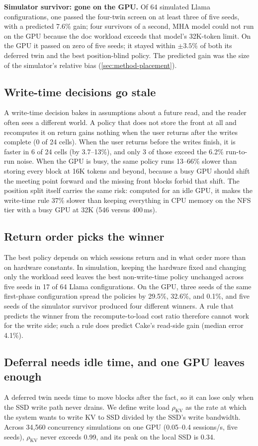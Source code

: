 \documentclass[conference]{IEEEtran}
\begin{document}
\textbf{Simulator survivor: gone on the GPU.}
Of 64 simulated Llama configurations, one passed the four-twin screen on at least three of five seeds, with a predicted 7.6\% gain; four survivors of a second, MHA model could not run on the GPU because the doc workload exceeds that model's 32K-token limit.
On the GPU it passed on zero of five seeds; it stayed within $\pm3.5\%$ of both its deferred twin and the best position-blind policy.
The predicted gain was the size of the simulator's relative bias (\cref{sec:method-placement}).

\subsection{Write-time decisions go stale}
A write-time decision bakes in assumptions about a future read, and the reader often sees a different world.
A policy that does not store the front at all and recomputes it on return gains nothing when the user returns after the writes complete (0 of 24 cells).
When the user returns before the writes finish, it is faster in 6 of 24 cells (by 3.7--13\%), and only 3 of those exceed the 6.2\% run-to-run noise.
When the GPU is busy, the same policy runs 13--66\% slower than storing every block at 16K tokens and beyond, because a busy GPU should shift the meeting point forward and the missing front blocks forbid that shift.
The position split itself carries the same risk: computed for an idle GPU, it makes the write-time rule 37\% slower than keeping everything in CPU memory on the NFS tier with a busy GPU at 32K (546 versus 400\,ms).

\subsection{Return order picks the winner}
The best policy depends on which sessions return and in what order more than on hardware constants.
In simulation, keeping the hardware fixed and changing only the workload seed leaves the best non-write-time policy unchanged across five seeds in 17 of 64 Llama configurations.
On the GPU, three seeds of the same first-phase configuration spread the policies by 29.5\%, 32.6\%, and 0.1\%, and five seeds of the simulator survivor produced four different winners.
A rule that predicts the winner from the recompute-to-load cost ratio therefore cannot work for the write side; such a rule does predict Cake's read-side gain (median error 4.1\%).

\subsection{Deferral needs idle time, and one GPU leaves enough}\label{sec:placement-idle}
A deferred twin needs time to move blocks after the fact, so it can lose only when the SSD write path never drains.
We define write load $\rho_\mathrm{KV}$ as the rate at which the system wants to write KV to SSD divided by the SSD's write bandwidth.
Across 34,560 concurrency simulations on one GPU (0.05--0.4 sessions/s, five seeds), $\rho_\mathrm{KV}$ never exceeds 0.99, and its peak on the local SSD is 0.34.
\end{document}
